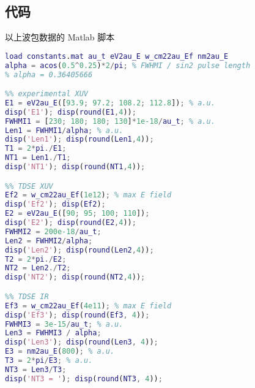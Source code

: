 \subsection{代码}
以上波包数据的 Matlab 脚本
\begin{lstlisting}[language=matlab]
load constants.mat au_t eV2au_E w_cm22au_Ef nm2au_E
alpha = acos(0.5^0.25)*2/pi; % FWHMI / sin2 pulse length
% alpha = 0.36405666

%% experimental XUV
E1 = eV2au_E([93.9; 97.2; 108.2; 112.8]); % a.u.
disp('E1'); disp(round(E1,4));
FWHMI1 = [230; 180; 180; 130]*1e-18/au_t; % a.u.
Len1 = FWHMI1/alpha; % a.u.
disp('Len1'); disp(round(Len1,4));
T1 = 2*pi./E1;
NT1 = Len1./T1;
disp('NT1'); disp(round(NT1,4));

%% TDSE XUV
Ef2 = w_cm22au_Ef(1e12); % max E field
disp('Ef2'); disp(Ef2);
E2 = eV2au_E([90; 95; 100; 110]);
disp('E2'); disp(round(E2,4));
FWHMI2 = 200e-18/au_t;
Len2 = FWHMI2/alpha;
disp('Len2'); disp(round(Len2,4));
T2 = 2*pi./E2;
NT2 = Len2./T2;
disp('NT2'); disp(round(NT2,4));

%% TDSE IR
Ef3 = w_cm22au_Ef(4e11); % max E field
disp('Ef3'); disp(round(Ef3, 4));
FWHMI3 = 3e-15/au_t; % a.u.
Len3 = FWHMI3 / alpha;
disp('Len3'); disp(round(Len3, 4));
E3 = nm2au_E(800); % a.u.
T3 = 2*pi/E3; % a.u.
NT3 = Len3/T3;
disp('NT3 = '); disp(round(NT3, 4));
\end{lstlisting}
